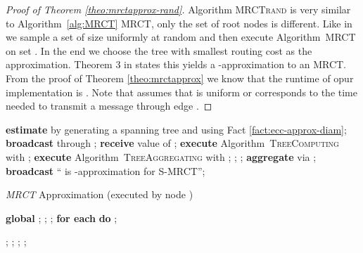 \documentclass[11pt]{article}
\newif\iffull
\begin{document}
\begin{proof}[Proof of Theorem \ref{theo:mrctapprox-rand}]
Algorithm \textsc{MRCTrand} is very similar to Algorithm~\ref{alg:MRCT} \textsc{MRCT}, only the set of root nodes is different. 
Like in \cite{hochuli:holzer:MRCST} we sample a set  of size  uniformly at random and then execute Algorithm\iffull~\ref{alg:MRCT}\fi~\textsc{MRCT} on set . In the end we choose the tree with smallest routing cost as the approximation. Theorem 3 in \cite{hochuli:holzer:MRCST} states this yields a -approximation to an MRCT. From the proof of Theorem \ref{theo:mrctapprox} we know that the runtime of opur implementation is . Note that \cite{hochuli:holzer:MRCST} assumes that  is uniform or corresponds to the time needed to transmit a message through edge .
\end{proof}

\begin{algorithm}[htb]
\begin{algorithmic}[1]
\IF{}\label{line:MRCTstart}
        \STATE \textbf{estimate}  by generating a spanning tree  and using Fact \ref{fact:ecc-approx-diam};
        \STATE \textbf{broadcast}  through ;
\ELSE
        \STATE \textbf{receive} value of ;
\ENDIF \label{line:MRCTendestim}
\STATE \textbf{execute} Algorithm\iffull~\ref{alg:TreeComputing}\fi~\textsc{TreeComputing}  with ; \label{line:MRCTalgdist}
\STATE \textbf{execute} Algorithm\iffull~\ref{alg:TreeAggregating}\fi~\textsc{TreeAggregating}  with ; \label{line:MRCTalgagg}
\IF{}\label{line:MRCTinftystart}
        \STATE ;
\ELSE
        \STATE ;
\ENDIF \label{line:MRCTinftyend}
\IF{} \label{line:MRCTminstart}
        \STATE \textbf{aggregate}  via ; \label{line:MRCTaggmin}
        \STATE \textbf{broadcast} `` is -approximation for S-MRCT''; \label{line:MRCTbroadmin}
\ENDIF \label{line:MRCTminend}
\end{algorithmic}
\caption{\textit{MRCT} Approximation (executed by node )}\label{alg:MRCT}
\vspace*{0.5cm}
\end{algorithm}

\begin{algorithm}[htb]
\begin{algorithmic}[1]
\STATE {} 
\STATE \textbf{global} ; \label{line:gmrctinitstart}
\IF{}
        \STATE ;
\ELSE
        \STATE ; 
\ENDIF \label{line:gmrctinitend}
\STATE \textbf{for each}  \textbf{do} ; \label{line:gmrctinitmsg}\newline

\STATE {}
\STATE ;
\STATE ;
\STATE ;
\STATE ; 
\end{algorithmic}
\caption{}
\label{alg:MRCT_g}
\vspace*{0.5cm}
\end{algorithm}
\end{document}
